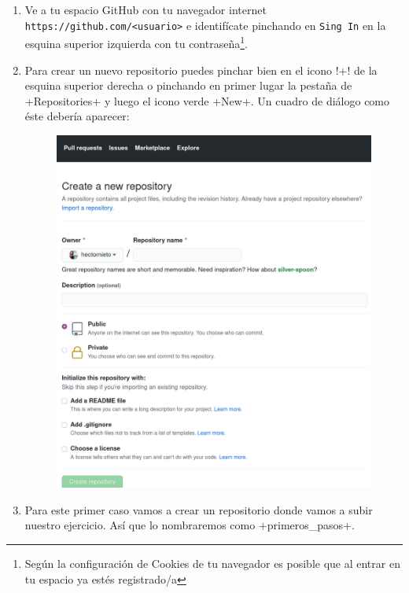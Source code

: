 \documentclass[a4paper,10pt]{article}
\begin{document}
      \begin{enumerate}
       \item Ve a tu espacio GitHub con tu navegador internet \verb+https://github.com/<usuario>+ e identifícate pinchando en \verb+Sing In+ en la esquina superior izquierda con tu contraseña\footnote{Según la configuración de Cookies de tu navegador es posible que al entrar en tu espacio ya estés registrado/a}.
       \item Para crear un nuevo repositorio puedes pinchar bien en el icono \cverb!+! de la esquina superior derecha o pinchando en primer lugar la pestaña de \cverb+Repositories+ y luego el icono verde \cverb+New+. Un cuadro de diálogo como éste debería aparecer:
       
       \begin{figure}[H]
        \includegraphics[width=\columnwidth]{github_create_new_repo.png}
       \end{figure}
       
       \item Para este primer caso vamos a crear un repositorio donde vamos a subir nuestro ejercicio. Así que lo nombraremos como \cverb+primeros_pasos+.
       

\end{enumerate}
\end{document}
